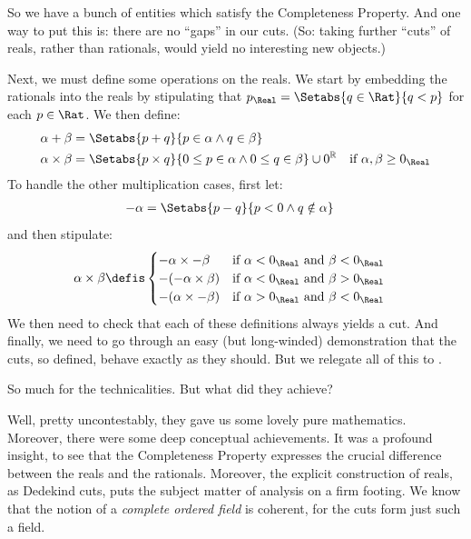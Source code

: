 So we have a bunch of entities which satisfy the Completeness
Property. And one way to put this is: there are no ``gaps'' in our
cuts. (So: taking further ``cuts'' of reals, rather than rationals,
would yield no interesting new objects.)

Next, we must define some operations on the reals. We start by
embedding the rationals into the reals by stipulating that $p_\Real =
\Setabs{q \in \Rat}{q < p}$ for each $p \in \Rat$. We then define:
\begin{align*}
	\alpha + \beta &= \Setabs{p + q}{p \in \alpha \land q \in \beta}\\

	\alpha \times \beta &= 
	\Setabs{p \times q}{0 \leq p \in \alpha \land 0 \leq q \in \beta} \cup 0^\mathbb{R} & \text{if }\alpha, \beta \geq 0_\Real


\end{align*}
To handle the other multiplication cases, first let: 
\begin{align*}
	-\alpha &= \Setabs{p - q}{p < 0 \land q \notin \alpha}
\end{align*}
and then stipulate:
\begin{align*}
	\alpha \times \beta &\defis 
	\begin{cases}
		\mathord{-}\alpha \times \mathord{-}\beta &\text{if }\alpha < 0_\Real\text{ and }\beta < 0_\Real\\
		\mathord{-}(\mathord{-}\alpha \times \beta) &\text{if }\alpha < 0_\Real \text{ and }\beta > 0_\Real\\
		\mathord{-}(\alpha \times \mathord{-}\beta) &\text{if }\alpha > 0_\Real \text{ and }\beta < 0_\Real
	\end{cases}
\end{align*}
We then need to check that each of these definitions always yields a
cut. And finally, we need to go through an easy (but long-winded)
demonstration that the cuts, so defined, behave exactly as they
should. But we relegate all of this to .




So much for the technicalities. But what did they achieve?

Well, pretty uncontestably, they gave us some {lovely} pure mathematics. Moreover,
there were some deep conceptual achievements. It was a profound
insight, to see that the Completeness Property expresses the crucial
difference between the reals and the rationals. Moreover, the explicit
construction of reals, as Dedekind cuts, puts the subject matter of
analysis on a firm footing. We know that the notion of a
\emph{complete ordered field} is coherent, for the cuts form just such
a field. 

